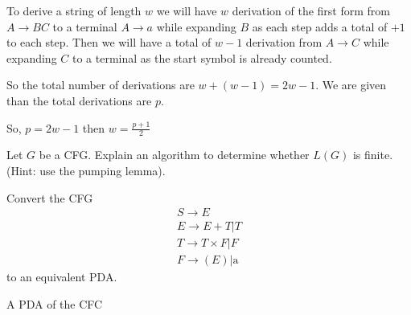 \documentclass[12pt]{exam}
\begin{document}
\begin{questions}
\begin{solution}
    To derive a string of length $w$ we will have $w$ derivation of the first form from $A\to BC$ to a terminal $A\to a$ while expanding $B$ as each step adds a total of $+1$ to each step. Then we will have a total of $w-1$ derivation from $A\to C$ while expanding $C$ to a terminal as the start symbol is already counted.

    So the total number of derivations are $w + (w-1) = 2w-1$. We are given than the total derivations are $p$.

    So, $p = 2w-1$ then $w = \frac{p+1}{2}$


  \end{solution}

  \question{} Let $G$ be a CFG. Explain an algorithm to determine whether $L(G)$ is finite. (Hint: use the pumping lemma).

  \question{} Convert the CFG
  \begin{gather*}
  S\to E\\
    E\to E+T|T\\
    T\to T \times F|F\\
    F\to (E)|\text{a}
    \end{gather*}
  to an equivalent PDA.

  \begin{solution}

    A PDA of the CFC



\end{solution}
\end{questions}
\end{document}
